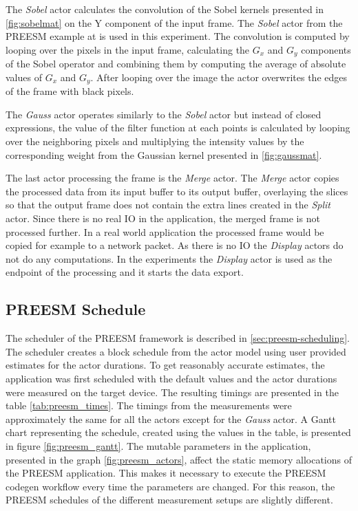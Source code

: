 The \textit{Sobel} actor calculates the convolution of the Sobel kernels presented in \ref{fig:sobelmat} on the Y component of the input frame. The \textit{Sobel} actor from the PREESM example at \cite{preesmtut} is used in this experiment. The convolution is computed by looping over the pixels in the input frame, calculating the $G_{x}$ and $G_{y}$ components of the Sobel operator and combining them by computing the average of absolute values of $G_{x}$ and $G_{y}$. After looping over the image the actor overwrites the edges of the frame with black pixels.

The \textit{Gauss} actor operates similarly to the \textit{Sobel} actor but instead of closed expressions, the value of the filter function at each points is calculated by looping over the neighboring pixels and multiplying the intensity values by the corresponding weight from the Gaussian kernel presented in \ref{fig:gaussmat}.

The last actor processing the frame is the \textit{Merge} actor. The \textit{Merge} actor copies the processed data from its input buffer to its output buffer, overlaying the slices so that the output frame does not contain the extra lines created in the \textit{Split} actor. Since there is no real IO in the application, the merged frame is not processed further. In a real world application the processed frame would be copied for example to a network packet. As there is no IO the \textit{Display} actors do not do any computations. In the experiments the \textit{Display} actor is used as the endpoint of the processing and it starts the data export.

\subsection{PREESM Schedule}
\label{subsec:preesmsched}
The scheduler of the PREESM framework is described in \ref{sec:preesm-scheduling}. The scheduler creates a block schedule from the actor model using user provided estimates for the actor durations. To get reasonably accurate estimates, the application was first scheduled with the default values and the actor durations were measured on the target device. The resulting timings are presented in the table \ref{tab:preesm_times}. The timings from the measurements were approximately the same for all the actors except for the \textit{Gauss} actor. A Gantt chart representing the schedule, created using the values in the table, is presented in figure \ref{fig:preesm_gantt}. The mutable parameters in the application, presented in the graph \ref{fig:preesm_actors}, affect the static memory allocations of the PREESM application. This makes it necessary to execute the PREESM codegen workflow every time the parameters are changed. For this reason, the PREESM schedules of the different measurement setups are slightly different.

